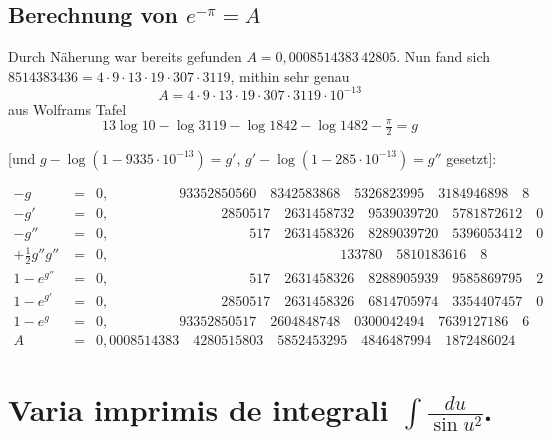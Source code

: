 \documentclass[10pt,a4paper]{article}
\begin{document}
\subsection*{Berechnung von \texorpdfstring{$e^{-\pi}=A$}{e\^{}(-pi)=A}}

Durch Näherung war bereits gefunden $A = 0{,}0008514383\,42805$. Nun
fand sich $8514383436 = 4\cdot9\cdot13\cdot19\cdot307\cdot3119$, mithin sehr genau
\[
A = 4\cdot9\cdot13\cdot19\cdot307\cdot3119\cdot10^{-13}
\]
aus Wolframs Tafel
\[
13\log 10 - \log 3119 - \log 1842 - \log 1482 - \tfrac{\pi}{2} = g
\]

[und $g-\log(1-9335\cdot10^{-13})=g'$, $g'-\log(1-285\cdot10^{-13})=g''$ gesetzt]:

\begin{align*}
-g &= \phantom{0}0{,}\phantom{0000000000}93352850560\quad 8342583868\quad 5326823995\quad 3184946898\quad 8\\
-g' &= \phantom{0}0{,}\phantom{0000000000000000}2850517\quad 2631458732\quad 9539039720\quad 5781872612\quad 0\\
-g''&= \phantom{0}0{,}\phantom{00000000000000000000}517\quad 2631458326\quad 8289039720\quad 5396053412\quad 0\\
+\tfrac12g''g''&= \phantom{0}0{,}\phantom{000000000000000000000000000000000}133780\quad 5810183616\quad 8\\
1-e^{g''} &= \phantom{0}0{,}\phantom{00000000000000000000}517\quad 2631458326\quad 8288905939\quad 9585869795\quad 2\\
1-e^{g'} &= \phantom{0}0{,}\phantom{0000000000000000}2850517\quad 2631458326\quad 6814705974\quad 3354407457\quad 0\\
1-e^g &= \phantom{0}0{,}\phantom{0000000000}93352850517\quad 2604848748\quad 0300042494\quad 7639127186\quad 6\\
A &= \phantom{0}0{,}0008514383\quad 4280515803\quad 5852453295\quad 4846487994\quad 1872486024
\end{align*}


\section*{Varia imprimis de integrali \texorpdfstring{$\int\!\frac{du}{\sin u^2}$}{}.}
\end{document}
